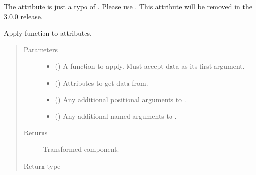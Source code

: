 \documentclass[letterpaper,10pt,english]{sphinxmanual}
\begin{document}
\begin{fulllineitems}
\begin{fulllineitems}
The attribute  is just a typo of . Please use .
This attribute will be removed in the 3.0.0 release.

\end{fulllineitems}


\begin{fulllineitems}
\label{\detokenize{api/wells:geology.src.wells.WellSegment.apply}}
Apply function to attributes.
\begin{quote}\begin{description}
\item[{Parameters}] \leavevmode\begin{itemize}
\item {} 
 () \textendash{} A function to apply. Must accept data as its first argument.

\item {} 
 (\sphinxstyleliteralemphasis{\sphinxupquote{, }}) \textendash{} Attributes to get data from.

\item {} 
 () \textendash{} Any additional positional arguments to .

\item {} 
 () \textendash{} Any additional named arguments to .

\end{itemize}

\item[{Returns}] \leavevmode
{} \textendash{} Transformed component.

\item[{Return type}] \leavevmode
{\hyperref[\detokenize{api/base_classes:geology.src.base_component.BaseComponent}]{}}


\end{description}
\end{quote}
\end{fulllineitems}
\end{fulllineitems}
\end{document}
